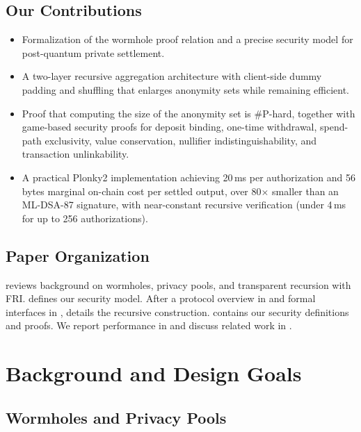 \documentclass{iacrcc}
\begin{document}
\subsection*{Our Contributions}

\begin{itemize}[leftmargin=1.5em]
    \item Formalization of the wormhole proof relation and a precise security model for post-quantum private settlement.
    \item A two-layer recursive aggregation architecture with client-side dummy padding and shuffling that enlarges anonymity sets while remaining efficient.
    \item Proof that computing the size of the anonymity set is \#P-hard, together with game-based security proofs for deposit binding, one-time withdrawal, spend-path exclusivity, value conservation, nullifier indistinguishability, and transaction unlinkability.
    \item A practical Plonky2 implementation achieving 20\,ms per authorization and 56 bytes marginal on-chain cost per settled output, over 80$\times$ smaller than an ML-DSA-87 signature, with near-constant recursive verification (under 4\,ms for up to 256 authorizations).
\end{itemize}

\subsection*{Paper Organization}

 reviews background on wormholes, privacy pools, and transparent recursion with FRI.  defines our security model. After a protocol overview in  and formal interfaces in ,  details the recursive construction.  contains our security definitions and proofs. We report performance in  and discuss related work in .

\section{Background and Design Goals}
\label{sec:background}

\subsection{Wormholes and Privacy Pools}
\end{document}
